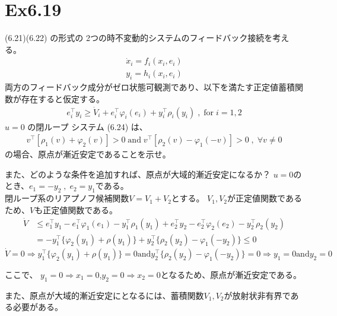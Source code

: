\documentclass{jsarticle}
\begin{document}
\section*{Ex6.19}
(6.21)(6.22) の形式の 2つの時不変動的システムのフィードバック接続を考える。 
\begin{align*}
  \dot x_i = f_i(x_i,e_i) \tag{6.21}\\
  y_i = h_i(x_i,e_i) \tag{6.22}
\end{align*}
両方のフィードバック成分がゼロ状態可観測であり、以下を満たす正定値蓄積関数が存在すると仮定する。
\begin{align*}
  e^\top_i y_i \geq \dot V_i + e_i^\top \varphi_i(e_i)+y_i^\top \rho_i(y_i) \;,\;\text{for}\;i=1,2
\end{align*}
$u = 0$ の閉ループ システム (6.24) は、
\begin{align*}
  v^\top [\rho_1(v) + \varphi_2(v)]>0 \;\text{and}\; v^\top [\rho_2(v)-\varphi_1(-v)]>0\;,\;\forall v \neq 0
\end{align*}
の場合、原点が漸近安定であることを示せ。

また、どのような条件を追加すれば、原点が大域的漸近安定になるか？
\vspace{1cm}
$u=0$のとき、$e_1 = -y_2\;,\;e_2 = y_1$である。\\
閉ループ系のリアプノフ候補関数$V = V_1 + V_2$とする。
$V_1,V_2$が正定値関数であるため、$V$も正定値関数である。
\begin{align*}
  \dot V &\leq e^\top_1 y_1-e_1^\top \varphi_1(e_1)-y_1^\top \rho_1(y_1)+e^\top_2 y_2-e_2^\top \varphi_2(e_2)-y_2^\top \rho_2(y_2)\\
  & = -y_1^\top \{\varphi_2(y_1)+\rho(y_1)\} + y_2^\top \{\rho_2(y_2)-\varphi_1(-y_2)\} \leq 0
\end{align*}
$\dot V = 0\Rightarrow y_1^\top \{\varphi_2(y_1)+\rho(y_1)\}=0 \text{and} y_2^\top \{\rho_2(y_2)-\varphi_1(-y_2)\} =0 \Rightarrow y_1 =0 \text{and} y_2=0$

ここで、
$y_1=0 \Rightarrow x_1=0$,$y_2 = 0\Rightarrow x_2 = 0$となるため、原点が漸近安定である。

また、原点が大域的漸近安定にとなるには、蓄積関数$V_1,V_2$が放射状非有界である必要がある。
\end{document}

